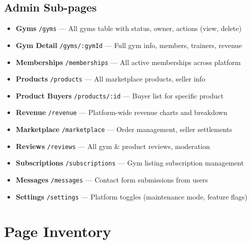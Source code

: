 \documentclass[a4paper,11pt]{article}
\begin{document}
\subsection{Admin Sub-pages}
{\footnotesize
\begin{itemize}[nosep]
  \item \textbf{Gyms} \texttt{/gyms} — All gyms table with status, owner, actions (view, delete)
  \item \textbf{Gym Detail} \texttt{/gyms/:gymId} — Full gym info, members, trainers, revenue
  \item \textbf{Memberships} \texttt{/memberships} — All active memberships across platform
  \item \textbf{Products} \texttt{/products} — All marketplace products, seller info
  \item \textbf{Product Buyers} \texttt{/products/:id} — Buyer list for specific product
  \item \textbf{Revenue} \texttt{/revenue} — Platform-wide revenue charts and breakdown
  \item \textbf{Marketplace} \texttt{/marketplace} — Order management, seller settlements
  \item \textbf{Reviews} \texttt{/reviews} — All gym \& product reviews, moderation
  \item \textbf{Subscriptions} \texttt{/subscriptions} — Gym listing subscription management
  \item \textbf{Messages} \texttt{/messages} — Contact form submissions from users
  \item \textbf{Settings} \texttt{/settings} — Platform toggles (maintenance mode, feature flags)
\end{itemize}
}

\newpage
\section{Page Inventory}
\end{document}
